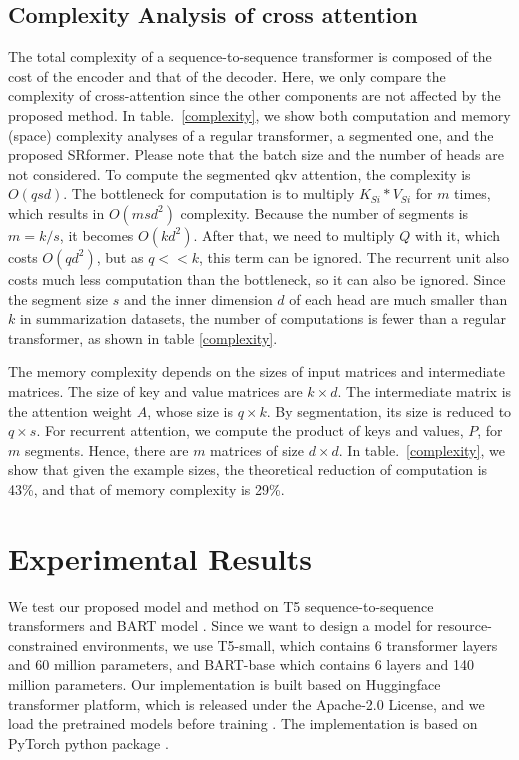 \documentclass[11pt]{article}
\begin{document}
\subsection{Complexity Analysis of cross attention}
The total complexity of a sequence-to-sequence transformer is composed of the cost of the encoder and that of the decoder. Here, we only compare the complexity of cross-attention since the other components are not affected by the proposed method. In table.~\ref{complexity}, we show both computation and memory (space) complexity analyses of a regular transformer, a segmented one, and the proposed SRformer. Please note that the batch size and the number of heads are not considered. To compute the segmented qkv attention, the complexity is $O(qsd)$. The bottleneck for computation is to multiply $K_{Si} * V_{Si}$ for $m$ times, which results in $O(msd^2)$ complexity. Because the number of segments is $m=k/s$, it becomes $O(kd^2)$. After that, we need to multiply $Q$ with it, which costs $O(qd^2)$, but as $q<<k$, this term can be ignored. The recurrent unit also costs much less computation than the bottleneck, so it can also be ignored. Since the segment size $s$ and the inner dimension $d$ of each head are much smaller than $k$ in summarization datasets, the number of computations is fewer than a regular transformer, as shown in table \ref{complexity}. 

The memory complexity depends on the sizes of input matrices and intermediate matrices. The size of key and value matrices are $k\times d$. The intermediate matrix is the attention weight $A$, whose size is $q\times k$. By segmentation, its size is reduced to $q\times s$. For recurrent attention, we compute the product of keys and values, $P$, for $m$ segments. Hence, there are $m$ matrices of size $d\times d$. In table.~\ref{complexity}, we show that given the example sizes, the theoretical reduction of computation is 43\%, and that of memory complexity is 29\%.


\section{Experimental Results}
\vspace{-2mm} We test our proposed model and method on T5 sequence-to-sequence transformers \citep{T5} and BART model \cite{lewis-etal-2020-bart}. Since we want to design a model for resource-constrained environments, we use T5-small, which contains 6 transformer layers and 60 million parameters, and BART-base which contains 6 layers and 140 million parameters. Our implementation is built based on Huggingface transformer platform, which is released under the Apache-2.0 License, and we load the pretrained models before training \citep{Huggingface}. The implementation is based on  PyTorch python package \citep{Paszke_PyTorch_An_Imperative_2019}.
\end{document}
